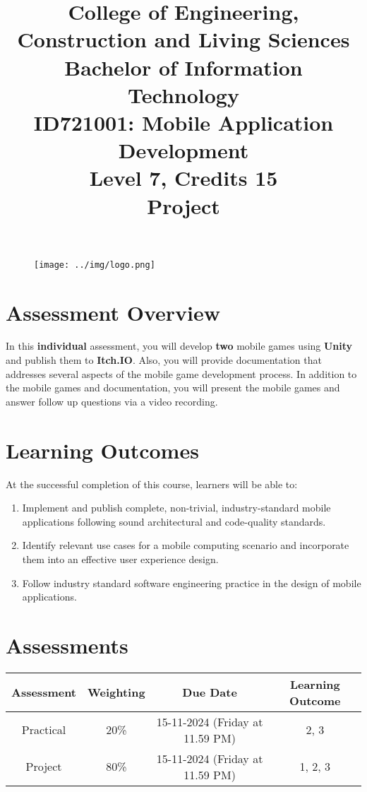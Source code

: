 \documentclass{article}
\author{}
\begin{document}
 

\begin{figure}
	\centering
	\texttt{[image: ../img/logo.png]}
\end{figure} 

\title{College of Engineering, Construction and Living Sciences\\Bachelor of Information Technology\\ID721001: Mobile Application Development\\Level 7, Credits 15\\\textbf{Project}}
\date{}
\maketitle

\section*{Assessment Overview}
In this \textbf{individual} assessment, you will develop \textbf{two} mobile games using \textbf{Unity} and publish them to \textbf{Itch.IO}. Also, you will provide documentation that addresses several aspects of the mobile game development process. In addition to the mobile games and documentation, you will present the mobile games and answer follow up questions via a video recording.

\section*{Learning Outcomes}
At the successful completion of this course, learners will be able to:
\begin{enumerate}
	\item Implement and publish complete, non-trivial, industry-standard mobile applications following sound architectural and code-quality standards.
	\item Identify relevant use cases for a mobile computing scenario and incorporate them into an effective user experience design.
	\item Follow industry standard software engineering practice in the design of mobile applications.
\end{enumerate}

\section*{Assessments}
\renewcommand{\arraystretch}{1.5}
\begin{tabular}{|c|c|c|c|}
	\hline
	\textbf{Assessment}                                 & \textbf{Weighting} & \textbf{Due Date}            & \textbf{Learning Outcome} \\ \hline
	\small Practical & \small 20\%        & \small 15-11-2024 (Friday at 11.59 PM)   & \small 2, 3                   \\ \hline
	\small Project                 & \small 80\%        & \small 15-11-2024 (Friday at 11.59 PM) \small  & \small 1, 2, 3                   \\ \hline
\end{tabular}
\end{document}
